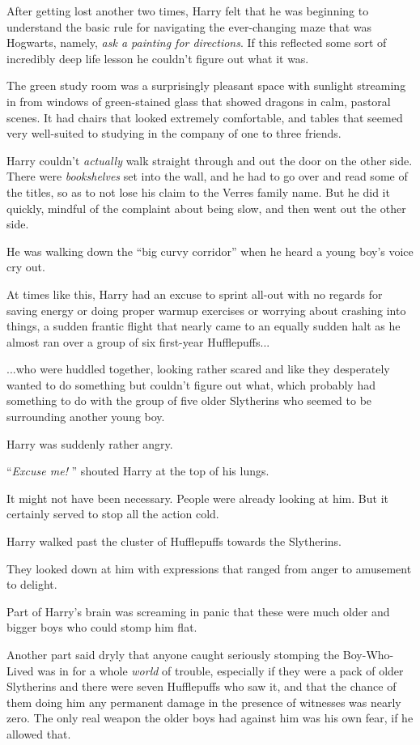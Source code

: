 After getting lost another two times, Harry felt that he was beginning
to understand the basic rule for navigating the ever-changing maze that
was Hogwarts, namely, \emph{ask a painting for directions}. If this
reflected some sort of incredibly deep life lesson he couldn't figure
out what it was.

The green study room was a surprisingly pleasant space with sunlight
streaming in from windows of green-stained glass that showed dragons in
calm, pastoral scenes. It had chairs that looked extremely comfortable,
and tables that seemed very well-suited to studying in the company of
one to three friends.

Harry couldn't \emph{actually} walk straight through and out the door on
the other side. There were \emph{bookshelves} set into the wall, and he
had to go over and read some of the titles, so as to not lose his claim
to the Verres family name. But he did it quickly, mindful of the
complaint about being slow, and then went out the other side.

He was walking down the ``big curvy corridor'' when he heard a young
boy's voice cry out.

At times like this, Harry had an excuse to sprint all-out with no
regards for saving energy or doing proper warmup exercises or worrying
about crashing into things, a sudden frantic flight that nearly came to
an equally sudden halt as he almost ran over a group of six first-year
Hufflepuffs...

...who were huddled together, looking rather scared and like they
desperately wanted to do something but couldn't figure out what, which
probably had something to do with the group of five older Slytherins who
seemed to be surrounding another young boy.

Harry was suddenly rather angry.

``\emph{Excuse me!} '' shouted Harry at the top of his lungs.

It might not have been necessary. People were already looking at him.
But it certainly served to stop all the action cold.

Harry walked past the cluster of Hufflepuffs towards the Slytherins.

They looked down at him with expressions that ranged from anger to
amusement to delight.

Part of Harry's brain was screaming in panic that these were much older
and bigger boys who could stomp him flat.

Another part said dryly that anyone caught seriously stomping the
Boy-Who-Lived was in for a whole \emph{world} of trouble, especially if
they were a pack of older Slytherins and there were seven Hufflepuffs
who saw it, and that the chance of them doing him any permanent damage
in the presence of witnesses was nearly zero. The only real weapon the
older boys had against him was his own fear, if he allowed that.

